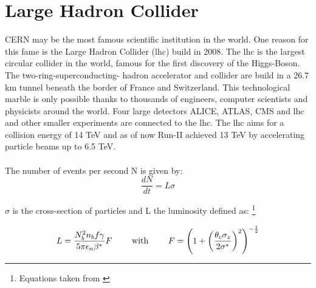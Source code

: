 \documentclass[../Bachelorarbeit.tex]{subfiles}
\begin{document}
\label{sec:LHC}
\section{Large Hadron Collider}
CERN may be the most famous scientific institution in the world. One reason for this fame is the Large Hadron Collider (\acrshort{lhc})\cite{Evans.2008} build in 2008. The \acrshort{lhc} is the largest circular collider in the world,
famous for the first discovery of the Higgs-Boson. The two-ring-superconducting- hadron accelerator and collider are build in a 26.7 km tunnel beneath the border of France and Switzerland.
This technological marble is only possible thanks to thousands of engineers, computer scientists and physicists around the world.
Four large detectors ALICE, ATLAS, CMS and \acrshort{lhc} and other smaller experiments are connected to the \acrshort{lhc}.
The \acrshort{lhc} aims for a collision energy of 14 TeV and as of now Run-II achieved 13 TeV by accelerating particle beams up to 6.5 TeV.\\\\
The number of events per second N is given by:
\begin{equation}
    \frac{dN}{dt} = L \sigma
\end{equation}

$\sigma$ is the cross-section of particles and L the luminosity defined as:
\footnote{Equations taken from \cite{Evans.2008}}

\begin{equation}
    L= \frac{N_{b}^{2} n_{b} f \gamma}{5 \pi \epsilon_{n} \beta^{*}} F \qquad \textnormal{ with } \qquad  F=\left( 1 + \left( \frac{\theta_{c} \sigma_{z}}{2 \sigma^{*}}\right)^{2} \right)^{-\frac{1}{2}}
\end{equation}
\end{document}
